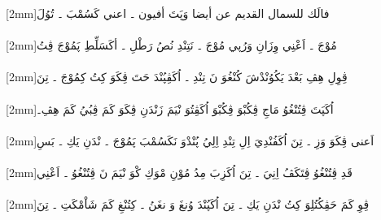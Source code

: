 \documentclass[a4paper, 12pt]{report}
\begin{document}
\begin{flushright}

{\scriptsize{}[2mm]}\textarabic{فالَك للسمال القديم عن أيضا وَپَتَ أفيون ۔ اعني كَسُمْبَ ۔ تُوُلَ} \\ 

 \\ 

{\scriptsize{}[2mm]}\textarabic{مُوْجَ ۔ اَعْنِي وِزَانِ وَرُپي مُوْجَ ۔ نَتِنْدِ نُصُ رَطْلِ ۔ أكَسَلِّطِ پَمُوْجَ ڤِتُ} \\ 

 \\ 

{\scriptsize{}[2mm]}\textarabic{ڤِوِلِ هِڤِ بَعْدَ يَكُوُنْدْشَ كُنْغُوَ نَ تِنْدِ ۔ اُكَڤِپُنْدَ حَتَ ڤِكَوَ كِتُ كِمُوْجَ ۔ تِنَ} \\ 

 \\ 

{\scriptsize{}[2mm]}\textarabic{اُكَپَتَ ڤِتُنْغُوُ مَاجِ ڤِكُبْوَ ڤِكُبْوَ اُكَڤِتُوَ نْيَمَ زَنْدَنِ ڤِكَوَ كَمَ ڤِبُيُ كَمَ هِڤِ۔} \\ 

 \\ 

{\scriptsize{}[2mm]}\textarabic{اَعنى ڤِكَوَ وَزِ ۔ تِنَ اُكَفُنْدِيَ اِلِ تِنْدِ اِلِيُ پُنْدْوَ نَكَسُمْبَ پَمُوْجَ ۔ نْدَنِ يَكِ ۔ بَسِ} \\ 

 \\ 

{\scriptsize{}[2mm]}\textarabic{قَدِ ڤِتُنْغُوُ ڤِتَكَڤُ اِنِيَ ۔ تِنَ اُكَزِبَ مِدُ مُوْنِ مْوَكِ كْوَ نْيَمَ نَ ڤِتُنْغُوُ ۔ اَعْنِي} \\ 

 \\ 

{\scriptsize{}[2mm]}\textarabic{ڤِوِ كَمَ حَڤِكُتُلِوَ كِتُ نْدَنِ يَكِ ۔ تِنَ اُكَپُنْدَ وُنغَ وَ نغَنُ ۔ كِتُنْغِ كَمَ شَاْمْكَتِ ۔ تِنَ} \\ 


\end{flushright}
\end{document}
